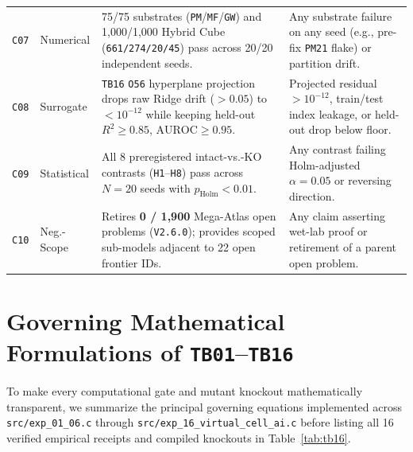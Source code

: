 \documentclass[11pt,reqno]{amsart}
\begin{document}
\begin{table}[t]
\begin{tabularx}{\textwidth}{@{}l l L L@{}}
\texttt{C07} & Numerical & 75/75 substrates (\texttt{PM}/\texttt{MF}/\texttt{GW}) and 1,000/1,000 Hybrid Cube (\texttt{661/274/20/45}) pass across 20/20 independent seeds. & Any substrate failure on any seed (e.g., pre-fix \texttt{PM21} flake) or partition drift. \\
\texttt{C08} & Surrogate & \texttt{TB16} \texttt{O56} hyperplane projection drops raw Ridge drift ($>0.05$) to $<10^{-12}$ while keeping held-out $R^2 \ge 0.85$, $\mathrm{AUROC} \ge 0.95$. & Projected residual $>10^{-12}$, train/test index leakage, or held-out drop below floor. \\
\texttt{C09} & Statistical & All 8 preregistered intact-vs.-KO contrasts (\texttt{H1}--\texttt{H8}) pass across $N=20$ seeds with $p_{\mathrm{Holm}} < 0.01$. & Any contrast failing Holm-adjusted $\alpha = 0.05$ or reversing direction. \\
\texttt{C10} & Neg.-Scope & Retires \textbf{0 / 1,900} Mega-Atlas open problems (\texttt{V2.6.0}); provides scoped sub-models adjacent to 22 open frontier IDs. & Any claim asserting wet-lab proof or retirement of a parent open problem. \\
\bottomrule
\end{tabularx}
\end{table}

\section{Governing Mathematical Formulations of \texorpdfstring{\texttt{TB01}--\texttt{TB16}}{TB01-TB16}}
\label{sec:math}

To make every computational gate and mutant knockout mathematically transparent, we summarize the principal governing equations implemented across \nolinkurl{src/exp_01_06.c} through \nolinkurl{src/exp_16_virtual_cell_ai.c} before listing all 16 verified empirical receipts and compiled knockouts in Table~\ref{tab:tb16}.
\end{document}
